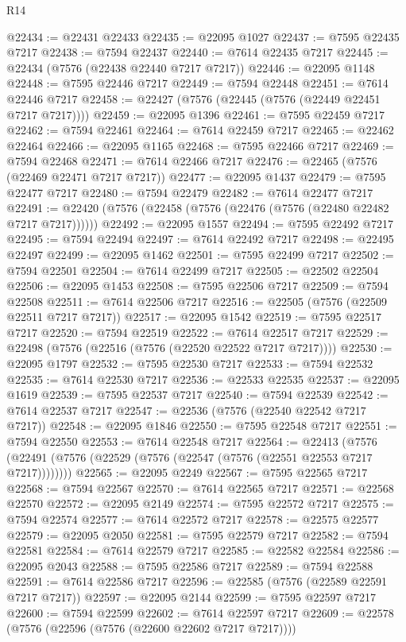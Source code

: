 \begin{lexlean}{R14}
\begin{coremodule}
@22434 := @22431 @22433
@22435 := @22095 @1027
@22437 := @7595 @22435 @7217
@22438 := @7594 @22437
@22440 := @7614 @22435 @7217
@22445 := @22434 (@7576 (@22438 @22440 @7217 @7217))
@22446 := @22095 @1148
@22448 := @7595 @22446 @7217
@22449 := @7594 @22448
@22451 := @7614 @22446 @7217
@22458 := @22427 (@7576 (@22445 (@7576 (@22449 @22451 @7217 @7217))))
@22459 := @22095 @1396
@22461 := @7595 @22459 @7217
@22462 := @7594 @22461
@22464 := @7614 @22459 @7217
@22465 := @22462 @22464
@22466 := @22095 @1165
@22468 := @7595 @22466 @7217
@22469 := @7594 @22468
@22471 := @7614 @22466 @7217
@22476 := @22465 (@7576 (@22469 @22471 @7217 @7217))
@22477 := @22095 @1437
@22479 := @7595 @22477 @7217
@22480 := @7594 @22479
@22482 := @7614 @22477 @7217
@22491 := @22420 (@7576 (@22458 (@7576 (@22476 (@7576 (@22480 @22482 @7217 @7217))))))
@22492 := @22095 @1557
@22494 := @7595 @22492 @7217
@22495 := @7594 @22494
@22497 := @7614 @22492 @7217
@22498 := @22495 @22497
@22499 := @22095 @1462
@22501 := @7595 @22499 @7217
@22502 := @7594 @22501
@22504 := @7614 @22499 @7217
@22505 := @22502 @22504
@22506 := @22095 @1453
@22508 := @7595 @22506 @7217
@22509 := @7594 @22508
@22511 := @7614 @22506 @7217
@22516 := @22505 (@7576 (@22509 @22511 @7217 @7217))
@22517 := @22095 @1542
@22519 := @7595 @22517 @7217
@22520 := @7594 @22519
@22522 := @7614 @22517 @7217
@22529 := @22498 (@7576 (@22516 (@7576 (@22520 @22522 @7217 @7217))))
@22530 := @22095 @1797
@22532 := @7595 @22530 @7217
@22533 := @7594 @22532
@22535 := @7614 @22530 @7217
@22536 := @22533 @22535
@22537 := @22095 @1619
@22539 := @7595 @22537 @7217
@22540 := @7594 @22539
@22542 := @7614 @22537 @7217
@22547 := @22536 (@7576 (@22540 @22542 @7217 @7217))
@22548 := @22095 @1846
@22550 := @7595 @22548 @7217
@22551 := @7594 @22550
@22553 := @7614 @22548 @7217
@22564 := @22413
    (@7576 (@22491 (@7576 (@22529 (@7576 (@22547 (@7576 (@22551 @22553 @7217 @7217))))))))
@22565 := @22095 @2249
@22567 := @7595 @22565 @7217
@22568 := @7594 @22567
@22570 := @7614 @22565 @7217
@22571 := @22568 @22570
@22572 := @22095 @2149
@22574 := @7595 @22572 @7217
@22575 := @7594 @22574
@22577 := @7614 @22572 @7217
@22578 := @22575 @22577
@22579 := @22095 @2050
@22581 := @7595 @22579 @7217
@22582 := @7594 @22581
@22584 := @7614 @22579 @7217
@22585 := @22582 @22584
@22586 := @22095 @2043
@22588 := @7595 @22586 @7217
@22589 := @7594 @22588
@22591 := @7614 @22586 @7217
@22596 := @22585 (@7576 (@22589 @22591 @7217 @7217))
@22597 := @22095 @2144
@22599 := @7595 @22597 @7217
@22600 := @7594 @22599
@22602 := @7614 @22597 @7217
@22609 := @22578 (@7576 (@22596 (@7576 (@22600 @22602 @7217 @7217))))

\end{coremodule}
\end{lexlean}
